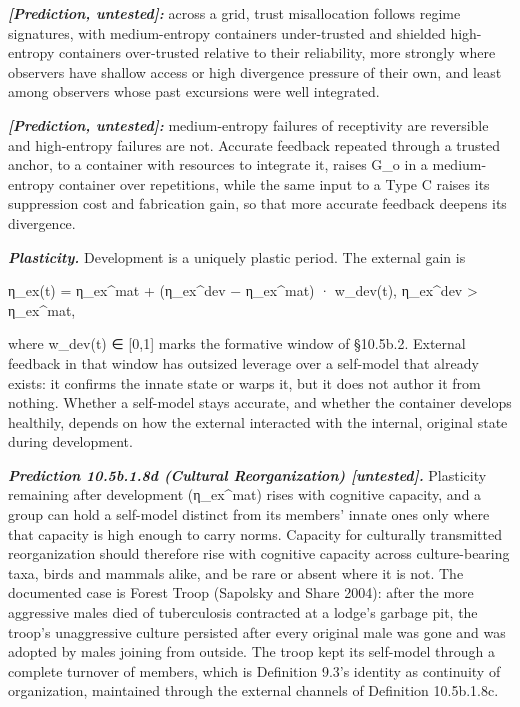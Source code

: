\documentclass[
]{article}
\begin{document}
\emph{\textbf{{[}Prediction, untested{]}:}} across a grid, trust
misallocation follows regime signatures, with medium-entropy containers
under-trusted and shielded high-entropy containers over-trusted relative
to their reliability, more strongly where observers have shallow access
or high divergence pressure of their own, and least among observers
whose past excursions were well integrated.

\emph{\textbf{{[}Prediction, untested{]}:}} medium-entropy failures of
receptivity are reversible and high-entropy failures are not. Accurate
feedback repeated through a trusted anchor, to a container with
resources to integrate it, raises G\_o in a medium-entropy container
over repetitions, while the same input to a Type C raises its
suppression cost and fabrication gain, so that more accurate feedback
deepens its divergence.

\emph{\textbf{Plasticity.}} Development is a uniquely plastic period.
The external gain is

η\_ex(t) = η\_ex\^{}mat + (η\_ex\^{}dev − η\_ex\^{}mat) · w\_dev(t),
η\_ex\^{}dev \textgreater{} η\_ex\^{}mat,

where w\_dev(t) ∈ {[}0,1{]} marks the formative window of §10.5b.2.
External feedback in that window has outsized leverage over a self-model
that already exists: it confirms the innate state or warps it, but it
does not author it from nothing. Whether a self-model stays accurate,
and whether the container develops healthily, depends on how the
external interacted with the internal, original state during
development.

\emph{\textbf{Prediction 10.5b.1.8d (Cultural Reorganization)
{[}untested{]}.}} Plasticity remaining after development (η\_ex\^{}mat)
rises with cognitive capacity, and a group can hold a self-model
distinct from its members' innate ones only where that capacity is high
enough to carry norms. Capacity for culturally transmitted
reorganization should therefore rise with cognitive capacity across
culture-bearing taxa, birds and mammals alike, and be rare or absent
where it is not. The documented case is Forest Troop (Sapolsky and Share
2004): after the more aggressive males died of tuberculosis contracted
at a lodge's garbage pit, the troop's unaggressive culture persisted
after every original male was gone and was adopted by males joining from
outside. The troop kept its self-model through a complete turnover of
members, which is Definition 9.3's identity as continuity of
organization, maintained through the external channels of Definition
10.5b.1.8c.
\end{document}

